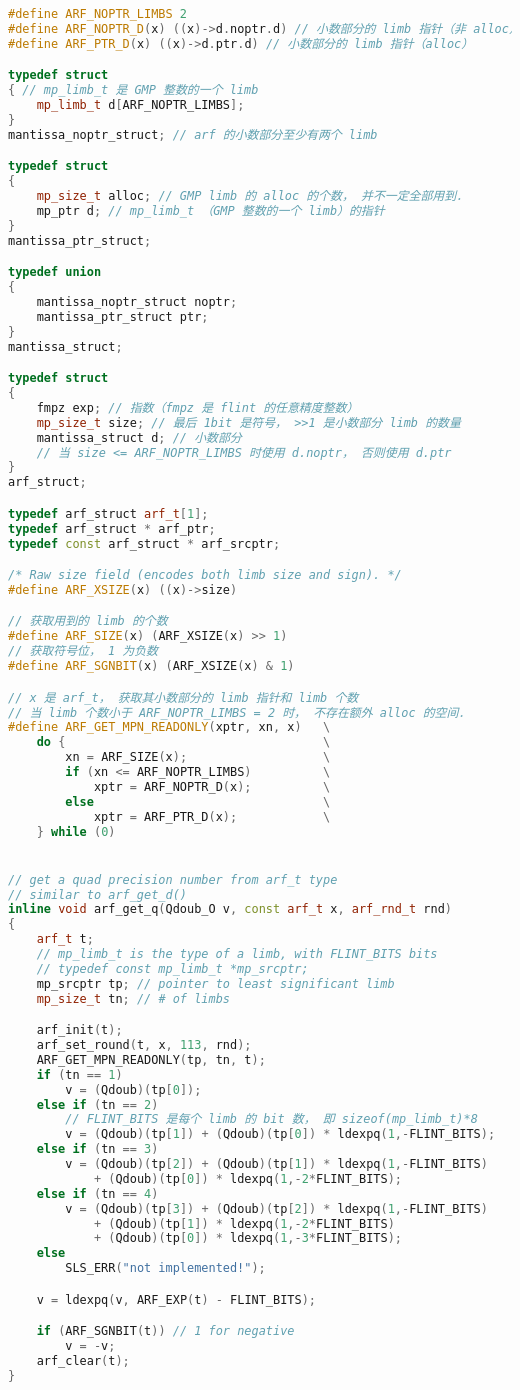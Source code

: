 \begin{lstlisting}[language=cpp]
#define ARF_NOPTR_LIMBS 2
#define ARF_NOPTR_D(x) ((x)->d.noptr.d) // 小数部分的 limb 指针（非 alloc）
#define ARF_PTR_D(x) ((x)->d.ptr.d) // 小数部分的 limb 指针（alloc）

typedef struct
{ // mp_limb_t 是 GMP 整数的一个 limb
    mp_limb_t d[ARF_NOPTR_LIMBS];
}
mantissa_noptr_struct; // arf 的小数部分至少有两个 limb

typedef struct
{
    mp_size_t alloc; // GMP limb 的 alloc 的个数， 并不一定全部用到．
    mp_ptr d; // mp_limb_t （GMP 整数的一个 limb）的指针
}
mantissa_ptr_struct;

typedef union
{
    mantissa_noptr_struct noptr;
    mantissa_ptr_struct ptr;
}
mantissa_struct;

typedef struct
{
    fmpz exp; // 指数（fmpz 是 flint 的任意精度整数）
    mp_size_t size; // 最后 1bit 是符号， >>1 是小数部分 limb 的数量
    mantissa_struct d; // 小数部分
	// 当 size <= ARF_NOPTR_LIMBS 时使用 d.noptr， 否则使用 d.ptr
}
arf_struct;

typedef arf_struct arf_t[1];
typedef arf_struct * arf_ptr;
typedef const arf_struct * arf_srcptr;

/* Raw size field (encodes both limb size and sign). */
#define ARF_XSIZE(x) ((x)->size)

// 获取用到的 limb 的个数
#define ARF_SIZE(x) (ARF_XSIZE(x) >> 1)
// 获取符号位， 1 为负数
#define ARF_SGNBIT(x) (ARF_XSIZE(x) & 1)

// x 是 arf_t， 获取其小数部分的 limb 指针和 limb 个数
// 当 limb 个数小于 ARF_NOPTR_LIMBS = 2 时， 不存在额外 alloc 的空间．
#define ARF_GET_MPN_READONLY(xptr, xn, x)   \
    do {                                    \
        xn = ARF_SIZE(x);                   \
        if (xn <= ARF_NOPTR_LIMBS)          \
            xptr = ARF_NOPTR_D(x);          \
        else                                \
            xptr = ARF_PTR_D(x);            \
    } while (0)


// get a quad precision number from arf_t type
// similar to arf_get_d()
inline void arf_get_q(Qdoub_O v, const arf_t x, arf_rnd_t rnd)
{
	arf_t t;
	// mp_limb_t is the type of a limb, with FLINT_BITS bits
	// typedef const mp_limb_t *mp_srcptr;
	mp_srcptr tp; // pointer to least significant limb
	mp_size_t tn; // # of limbs

	arf_init(t);
	arf_set_round(t, x, 113, rnd);
	ARF_GET_MPN_READONLY(tp, tn, t);
	if (tn == 1)
		v = (Qdoub)(tp[0]);
	else if (tn == 2)
	    // FLINT_BITS 是每个 limb 的 bit 数， 即 sizeof(mp_limb_t)*8
		v = (Qdoub)(tp[1]) + (Qdoub)(tp[0]) * ldexpq(1,-FLINT_BITS);
	else if (tn == 3)
		v = (Qdoub)(tp[2]) + (Qdoub)(tp[1]) * ldexpq(1,-FLINT_BITS)
		    + (Qdoub)(tp[0]) * ldexpq(1,-2*FLINT_BITS);
	else if (tn == 4)
		v = (Qdoub)(tp[3]) + (Qdoub)(tp[2]) * ldexpq(1,-FLINT_BITS)
		    + (Qdoub)(tp[1]) * ldexpq(1,-2*FLINT_BITS)
			+ (Qdoub)(tp[0]) * ldexpq(1,-3*FLINT_BITS);
	else
		SLS_ERR("not implemented!");

	v = ldexpq(v, ARF_EXP(t) - FLINT_BITS);

	if (ARF_SGNBIT(t)) // 1 for negative
		v = -v;
	arf_clear(t);
}
\end{lstlisting}

